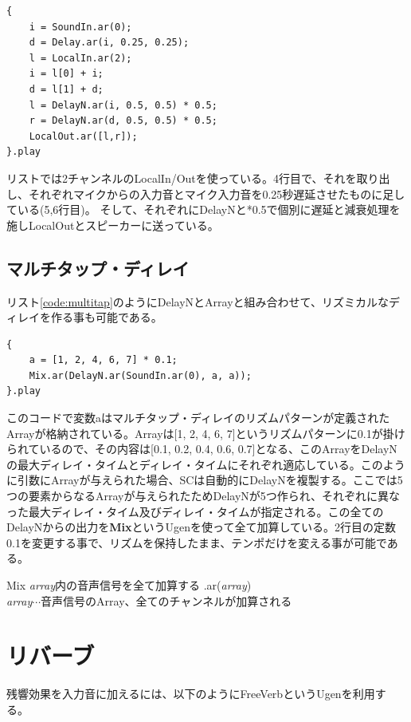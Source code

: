 \documentclass{jsarticle}
\begin{document}
\begin{lstlisting}[caption=ピンポン・ディレイ, label=code:pingpong]
{
	i = SoundIn.ar(0);
	d = Delay.ar(i, 0.25, 0.25);
	l = LocalIn.ar(2);
	i = l[0] + i;
	d = l[1] + d;
	l = DelayN.ar(i, 0.5, 0.5) * 0.5; 
	r = DelayN.ar(d, 0.5, 0.5) * 0.5;
	LocalOut.ar([l,r]);
}.play
\end{lstlisting}

リストでは2チャンネルのLocalIn/Outを使っている。4行目で、それを取り出し、それぞれマイクからの入力音とマイク入力音を0.25秒遅延させたものに足している(5,6行目)。
そして、それぞれにDelayNと*0.5で個別に遅延と減衰処理を施しLocalOutとスピーカーに送っている。

\subsection{マルチタップ・ディレイ}
リスト\ref{code:multitap}のようにDelayNとArrayと組み合わせて、リズミカルなディレイを作る事も可能である。

\begin{lstlisting}[caption=マルチタップ・ディレイ, label=code:multitap]
{
	a = [1, 2, 4, 6, 7] * 0.1;
	Mix.ar(DelayN.ar(SoundIn.ar(0), a, a));
}.play
\end{lstlisting}

このコードで変数aはマルチタップ・ディレイのリズムパターンが定義されたArrayが格納されている。Arrayは[1, 2, 4, 6, 7]というリズムパターンに0.1が掛けられているので、その内容は[0.1, 0.2, 0.4, 0.6, 0.7]となる、このArrayをDelayNの最大ディレイ・タイムとディレイ・タイムにそれぞれ適応している。このように引数にArrayが与えられた場合、SCは自動的にDelayNを複製する。ここでは5つの要素からなるArrayが与えられたためDelayNが5つ作られ、それぞれに異なった最大ディレイ・タイム及びディレイ・タイムが指定される。この全てのDelayNからの出力を{\bf Mix}というUgenを使って全て加算している。2行目の定数0.1を変更する事で、リズムを保持したまま、テンポだけを変える事が可能である。

\begin{itembox}[l]{Mix}
{\footnotesize 
{\it array}内の音声信号を全て加算する
.ar({\it array})\\
{\it array}$\cdots$音声信号のArray、全てのチャンネルが加算される\\
}
\end{itembox}

\section{リバーブ}
残響効果を入力音に加えるには、以下のようにFreeVerbというUgenを利用する。
\end{document}
